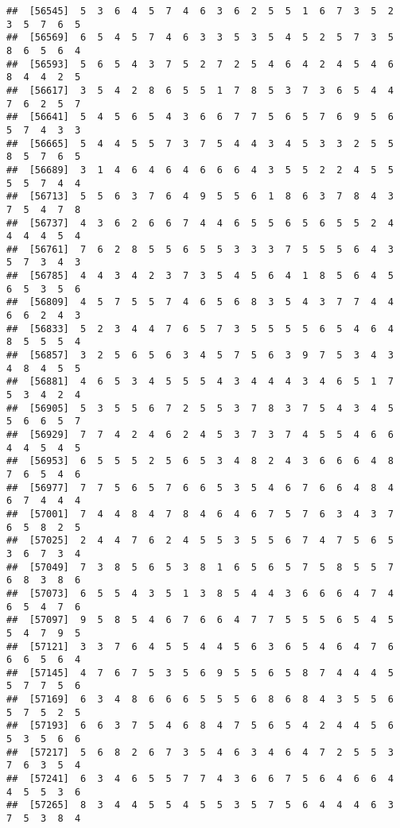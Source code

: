 \documentclass[
]{book}
\begin{document}
\begin{verbatim}
##  [56545]  5  3  6  4  5  7  4  6  3  6  2  5  5  1  6  7  3  5  2  3  5  7  6  5
##  [56569]  6  5  4  5  7  4  6  3  3  5  3  5  4  5  2  5  7  3  5  8  6  5  6  4
##  [56593]  5  6  5  4  3  7  5  2  7  2  5  4  6  4  2  4  5  4  6  8  4  4  2  5
##  [56617]  3  5  4  2  8  6  5  5  1  7  8  5  3  7  3  6  5  4  4  7  6  2  5  7
##  [56641]  5  4  5  6  5  4  3  6  6  7  7  5  6  5  7  6  9  5  6  5  7  4  3  3
##  [56665]  5  4  4  5  5  7  3  7  5  4  4  3  4  5  3  3  2  5  5  8  5  7  6  5
##  [56689]  3  1  4  6  4  6  4  6  6  6  4  3  5  5  2  2  4  5  5  5  5  7  4  4
##  [56713]  5  5  6  3  7  6  4  9  5  5  6  1  8  6  3  7  8  4  3  7  5  4  7  8
##  [56737]  4  3  6  2  6  6  7  4  4  6  5  5  6  5  6  5  5  2  4  4  4  4  5  4
##  [56761]  7  6  2  8  5  5  6  5  5  3  3  3  7  5  5  5  6  4  3  5  7  3  4  3
##  [56785]  4  4  3  4  2  3  7  3  5  4  5  6  4  1  8  5  6  4  5  6  5  3  5  6
##  [56809]  4  5  7  5  5  7  4  6  5  6  8  3  5  4  3  7  7  4  4  6  6  2  4  3
##  [56833]  5  2  3  4  4  7  6  5  7  3  5  5  5  5  6  5  4  6  4  8  5  5  5  4
##  [56857]  3  2  5  6  5  6  3  4  5  7  5  6  3  9  7  5  3  4  3  4  8  4  5  5
##  [56881]  4  6  5  3  4  5  5  5  4  3  4  4  4  3  4  6  5  1  7  5  3  4  2  4
##  [56905]  5  3  5  5  6  7  2  5  5  3  7  8  3  7  5  4  3  4  5  5  6  6  5  7
##  [56929]  7  7  4  2  4  6  2  4  5  3  7  3  7  4  5  5  4  6  6  4  4  5  4  5
##  [56953]  6  5  5  5  2  5  6  5  3  4  8  2  4  3  6  6  6  4  8  7  6  5  4  6
##  [56977]  7  7  5  6  5  7  6  6  5  3  5  4  6  7  6  6  4  8  4  6  7  4  4  4
##  [57001]  7  4  4  8  4  7  8  4  6  4  6  7  5  7  6  3  4  3  7  6  5  8  2  5
##  [57025]  2  4  4  7  6  2  4  5  5  3  5  5  6  7  4  7  5  6  5  3  6  7  3  4
##  [57049]  7  3  8  5  6  5  3  8  1  6  5  6  5  7  5  8  5  5  7  6  8  3  8  6
##  [57073]  6  5  5  4  3  5  1  3  8  5  4  4  3  6  6  6  4  7  4  6  5  4  7  6
##  [57097]  9  5  8  5  4  6  7  6  6  4  7  7  5  5  5  6  5  4  5  5  4  7  9  5
##  [57121]  3  3  7  6  4  5  5  4  4  5  6  3  6  5  4  6  4  7  6  6  6  5  6  4
##  [57145]  4  7  6  7  5  3  5  6  9  5  5  6  5  8  7  4  4  4  5  5  7  7  5  6
##  [57169]  6  3  4  8  6  6  6  5  5  5  6  8  6  8  4  3  5  5  6  5  7  5  2  5
##  [57193]  6  6  3  7  5  4  6  8  4  7  5  6  5  4  2  4  4  5  6  5  3  5  6  6
##  [57217]  5  6  8  2  6  7  3  5  4  6  3  4  6  4  7  2  5  5  3  7  6  3  5  4
##  [57241]  6  3  4  6  5  5  7  7  4  3  6  6  7  5  6  4  6  6  4  4  5  5  3  6
##  [57265]  8  3  4  4  5  5  4  5  5  3  5  7  5  6  4  4  4  6  3  7  5  3  8  4

\end{verbatim}
\end{document}
